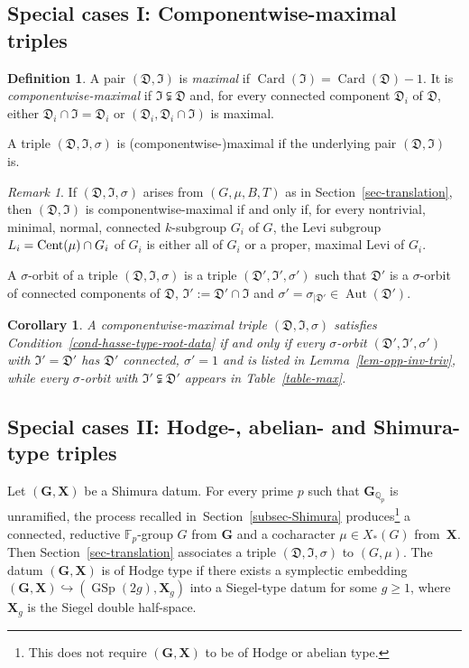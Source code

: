 \documentclass[11pt]{amsart}
\numberwithin{equation}{section}
\newtheorem{corollary}[theorem]{Corollary}
\theoremstyle{definition}
\newtheorem{definition}[theorem]{Definition}
\theoremstyle{remark}
\newtheorem{rmk}[theorem]{Remark}
\newcommand{\Dfr}{{\mathfrak D}}
\newcommand{\Ifr}{{\mathfrak I}}
\newcommand{\FF}{\mathbb{F}}
\newcommand{\cent}{{\rm Cent}}
\DeclareMathOperator{\card}{Card}
\DeclareMathOperator{\GSp}{GSp}
\newcommand{\gx}{(\mathbf G, \mathbf X)}
\DeclareMathOperator{\Aut}{Aut}
\begin{document}
\subsection{Special cases I: Componentwise-maximal triples}
\label{sec-special-max}

\begin{definition}
\label{def-maximal}
A pair $(\Dfr,\Ifr)$ is \emph{maximal} if $\card(\Ifr)=\card(\Dfr)-1$. 
It is   \emph{componentwise-maximal} if $\Ifr \subsetneqq \Dfr$ and, for every connected component $\Dfr_i$ of $\Dfr$, either  $\Dfr_i \cap \Ifr=\Dfr_i$ or $(\Dfr_i, \Dfr_i \cap \Ifr)$ is maximal. 
\end{definition}
A triple $(\Dfr, \Ifr, \sigma)$ is (componentwise-)maximal  if the underlying pair $(\Dfr, \Ifr)$ is.
\begin{rmk} If $(\Dfr,\Ifr, \sigma)$ arises from $(G,\mu,B,T)$ as in Section~\ref{sec-translation}, then $(\Dfr,\Ifr)$ is componentwise-maximal if and only if, for every nontrivial, minimal, normal, connected $k$-subgroup $G_i$ of $G$, the Levi subgroup $L_i=\cent(\mu) \cap G_i$ of $G_i$ is either all of $G_i$ or a proper, maximal Levi of $G_i$. 

\end{rmk}

A $\sigma$-orbit of a triple $(\Dfr, \Ifr, \sigma)$ is a triple $(\Dfr', \Ifr', \sigma')$ such that $\Dfr'$ is a $\sigma$-orbit of connected components of $\Dfr$, $\Ifr':=\Dfr' \cap \Ifr$ and $\sigma'=\sigma_{|\Dfr'} \in \Aut(\Dfr')$.
\begin{corollary}
\label{cor-maximal}
A componentwise-maximal triple $(\Dfr, \Ifr, \sigma)$ satisfies Condition~\ref{cond-hasse-type-root-data} if and only if every $\sigma$-orbit  $(\Dfr', \Ifr', \sigma')$ with $\Ifr'=\Dfr'$ has $\Dfr'$ connected, $\sigma'=1$ and is listed in Lemma~\ref{lem-opp-inv-triv}, while every  $\sigma$-orbit with $\Ifr' \subsetneqq \Dfr'$ appears in Table~\ref{table-max}.
\end{corollary}

\subsection{Special cases II: Hodge-, abelian- and Shimura-type triples}
\label{sec-special-hodge}
Let $\gx$ be a Shimura datum.
For every prime $p$ such that $\mathbf{G}_{\mathbb{Q}_p}$ is unramified, the process recalled in~Section~\ref{subsec-Shimura} produces\footnote{This does not require $\gx$ to be of Hodge or abelian type.} a connected, reductive $\FF_p$-group $G$ from $\mathbf{G}$ and a cocharacter $\mu \in X_*(G)$ from~$\mathbf{X}$.  
Then Section~\ref{sec-translation} associates a triple $(\Dfr, \Ifr, \sigma)$ to $(G,\mu)$. 
The datum $\gx$ is of Hodge type if there exists a symplectic embedding $\gx \hookrightarrow (\GSp(2g), \mathbf{X}_g)$ into a Siegel-type datum for some $g \geq 1$, where $\mathbf{X}_g$ is the Siegel double half-space. 
\end{document}
